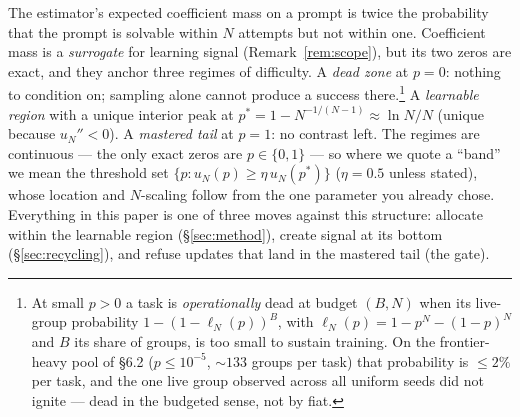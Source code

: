 \begin{interp}
The estimator's expected coefficient mass on a prompt is twice the
probability that the prompt is solvable within $N$ attempts but not
within one. Coefficient mass is a \emph{surrogate} for learning signal
(Remark~\ref{rem:scope}), but its two zeros are exact, and they anchor
three regimes of difficulty. A \emph{dead zone} at $p = 0$: nothing to
condition on; sampling alone cannot produce a success
there.\footnote{At small $p > 0$ a task is \emph{operationally} dead
at budget $(B,N)$ when its live-group probability
$1 - (1 - \ell_N(p))^{B}$, with $\ell_N(p) = 1 - p^N - (1-p)^N$ and
$B$ its share of groups, is too small to sustain training. On the
frontier-heavy pool of \S 6.2 ($p \le 10^{-5}$, ${\sim}133$ groups per
task) that probability is ${\le}2\%$ per task, and the one live group
observed across all uniform seeds did not ignite --- dead in the
budgeted sense, not by fiat.} A \emph{learnable region} with a unique
interior peak at $p^* = 1 - N^{-1/(N-1)} \approx \ln N/N$ (unique
because $u_N'' < 0$). A \emph{mastered tail} at $p = 1$: no contrast
left. The regimes are continuous --- the only exact zeros are
$p \in \{0,1\}$ --- so where we quote a ``band'' we mean the threshold
set $\{p : u_N(p) \ge \eta\, u_N(p^*)\}$ ($\eta{=}0.5$ unless stated),
whose location and $N$-scaling follow from the one parameter you
already chose. Everything in this paper is one of three moves against
this structure: allocate within the learnable region
(\S\ref{sec:method}), create signal at its bottom
(\S\ref{sec:recycling}), and refuse updates that land in the mastered
tail (the gate).
\end{interp}


